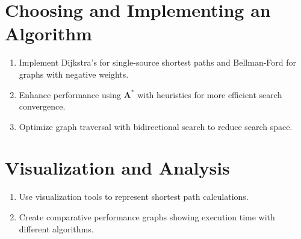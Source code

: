 \section*{Choosing and Implementing an Algorithm}
\begin{enumerate}
	
	\item Implement Dijkstra’s for single-source shortest paths and Bellman-Ford for graphs with negative weights.
	\item Enhance performance using \( \mathbf{A^*} \) with heuristics for more efficient search convergence.
	\item Optimize graph traversal with bidirectional search to reduce search space.
	
\end{enumerate}

\section*{Visualization and Analysis}

\begin{enumerate}
	\item Use visualization tools to represent shortest path calculations.
	\item Create comparative performance graphs showing execution time with different algorithms. 
\end{enumerate}

